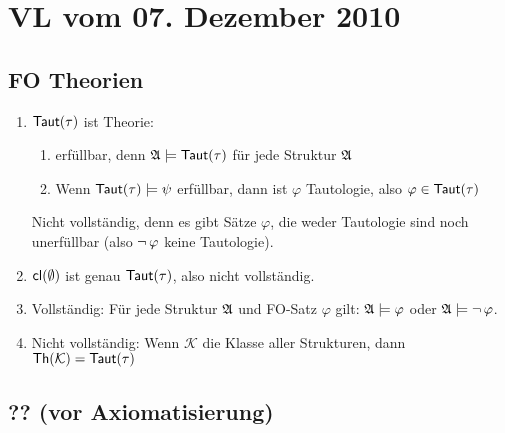 \section{VL vom 07. Dezember 2010}

\subsection{FO Theorien}

\begin{enumerate}
  \item $\operatorname{\text{\textsf{Taut}}}(\tau)$ ist Theorie:
  \begin{enumerate}
    \item erfüllbar, denn $\mathfrak{A}\models\operatorname{\text{\textsf{Taut}}}(\tau)$ für jede Struktur
    $\mathfrak{A}$
    
    \item Wenn $\operatorname{\text{\textsf{Taut}}}(\tau)\models\psi$ erfüllbar, dann ist $\varphi$
    Tautologie, also $\varphi\in\operatorname{\text{\textsf{Taut}}}(\tau)$
  \end{enumerate}
  
  Nicht vollständig, denn es gibt Sätze $\varphi$, die weder Tautologie
  sind noch unerfüllbar (also $\operatorname{\neg}\varphi$ keine Tautologie).
  
  \item $\operatorname{\text{\textsf{cl}}}(\emptyset)$ ist genau $\operatorname{\text{\textsf{Taut}}}(\tau)$, also nicht vollständig.
  
  \item Vollständig: Für jede Struktur $\mathfrak{A}$ und FO-Satz $\varphi$
  gilt: $\mathfrak{A}\models\varphi$ oder $\mathfrak{A}\models\operatorname{\neg}\varphi$.
  
  \item Nicht vollständig: Wenn $\mathcal{K}$ die Klasse aller
  Strukturen, dann $\operatorname{\text{\textsf{Th}}}(\mathcal{K}) = \operatorname{\text{\textsf{Taut}}}(\tau)$
\end{enumerate}

\subsection{?? (vor Axiomatisierung)}

